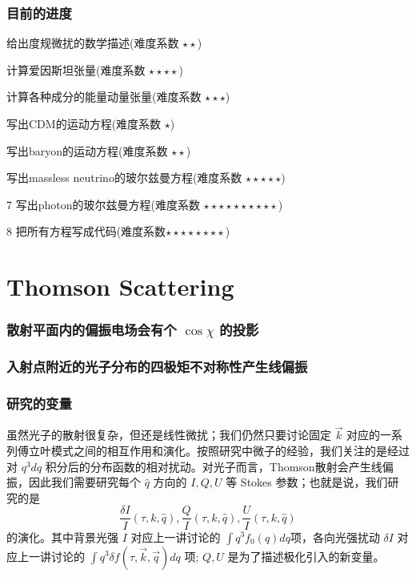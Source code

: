 \documentclass[CJK,13pt]{beamer}
\date{}
\begin{document}
  \bch

  

  \begin{frame}
    \frametitle{目前的进度}
    \bitem
  \item[\checkmark]{给出度规微扰的数学描述(难度系数 $\star\star$)}
  \item[\checkmark]{计算爱因斯坦张量(难度系数 $\star\star\star\star$)}
  \item[\checkmark]{计算各种成分的能量动量张量(难度系数 $\star\star\star$)}    
  \item[\checkmark]{写出CDM的运动方程(难度系数 $\star$)}
  \item[\checkmark]{写出baryon的运动方程(难度系数 $\star\star$)}        
  \item[\checkmark]{写出massless neutrino的玻尔兹曼方程(难度系数 $\star\star\star\star\star$)}
  \item[7]{写出photon的玻尔兹曼方程(难度系数 $\star\star\star\star\star\star\star\star\star\star$)}
  \item[8]{把所有方程写成代码(难度系数$\star\star\star\star\star\star\star\star$)}
    \eitem

    \skipline

  \end{frame}
    



  \section{Thomson Scattering}


  \begin{frame}
    \frametitle{散射平面内的偏振电场会有个 $\cos\chi$ 的投影}
  \end{frame}


  \begin{frame}
    \frametitle{入射点附近的光子分布的四极矩不对称性产生线偏振}
  \end{frame}


  \begin{frame}
    \frametitle{研究的变量}
    虽然光子的散射很复杂，但还是线性微扰；我们仍然只要讨论固定 $\vec{k}$ 对应的一系列傅立叶模式之间的相互作用和演化。按照研究中微子的经验，我们关注的是经过对 $q^3dq$ 积分后的分布函数的相对扰动。对光子而言，Thomson散射会产生线偏振，因此我们需要研究每个 $\hat{q}$ 方向的 $I, Q, U$ 等 Stokes 参数；也就是说，我们研究的是
    $$\frac{\delta I}{I}(\tau, k, \hat{q}),  \frac{Q}{I}(\tau, k, \hat{q}), \frac{U}{I}(\tau, k, \hat{q}) $$
    的演化。其中背景光强 $I$ 对应上一讲讨论的 $\int q^3f_0(q)dq$项，各向光强扰动 $\delta I$ 对应上一讲讨论的 $\int q^3\delta f(\tau, \vec{k}, \vec{q}) dq$ 项; $Q, U$ 是为了描述极化引入的新变量。
  \end{frame}
\end{document}
